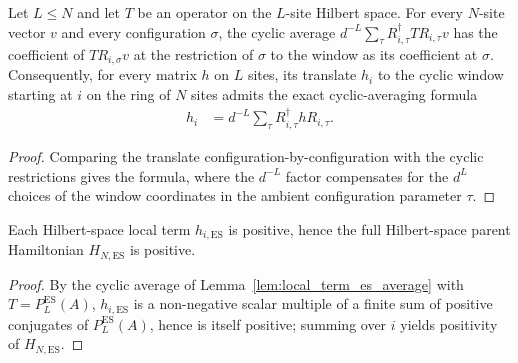 \begin{lemma}
    \label{lem:local_term_es_average}
    \leanok
    Let $L\le N$ and let
    $T$ be an operator on the $L$-site Hilbert space. For every $N$-site vector
    $v$ and every configuration $\sigma$, the cyclic average
    $d^{-L}\sum_{\tau}R_{i,\tau}^{\dagger}TR_{i,\tau}v$ has the coefficient of
    $TR_{i,\sigma}v$ at the restriction of $\sigma$ to the window as its
    coefficient at $\sigma$. Consequently, for every matrix $h$ on $L$ sites,
    its translate $h_i$ to the cyclic window starting at $i$ on the ring of
    $N$ sites admits the exact cyclic-averaging formula
    \begin{align}
        h_i
         & =d^{-L}\sum_{\tau}
        R_{i,\tau}^{\dagger}hR_{i,\tau}.
        \label{eq:ph_cyclic_averaging}
    \end{align}
\end{lemma}

\begin{proof}
    \leanok
    Comparing the translate
    configuration-by-configuration with the cyclic restrictions gives the
    formula, where the $d^{-L}$ factor compensates for the $d^L$ choices of
    the window coordinates in the ambient configuration parameter $\tau$.
\end{proof}

\begin{lemma}
    \label{lem:transported_es_positive}
    \leanok
    Each Hilbert-space local term $h_{i,\mathrm{ES}}$ is positive, hence the full
    Hilbert-space parent Hamiltonian $H_{N,\mathrm{ES}}$ is positive.
\end{lemma}

\begin{proof}
    \leanok
    By the cyclic average of Lemma~\ref{lem:local_term_es_average} with
    $T=P_L^{\mathrm{ES}}(A)$,
    $h_{i,\mathrm{ES}}$ is a non-negative scalar multiple of a finite sum of
    positive conjugates of $P_L^{\mathrm{ES}}(A)$, hence is itself positive;
    summing over $i$ yields positivity of $H_{N,\mathrm{ES}}$.
\end{proof}

